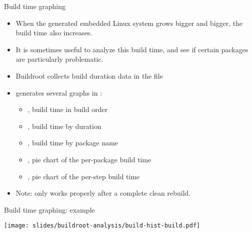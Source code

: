\begin{frame}{Build time graphing}
  \begin{itemize}
  \item When the generated embedded Linux system grows bigger and
    bigger, the build time also increases.
  \item It is sometimes useful to analyze this build time, and see if
    certain packages are particularly problematic.
  \item Buildroot collects build duration data in the file
  \item {} generates several graphs in
    :
    \begin{itemize}
    \item {}, build time in build order
    \item {}, build time by duration
    \item {}, build time by package name
    \item {}, pie chart of the per-package
      build time
    \item {}, pie chart of the per-step build
      time
    \end{itemize}
  \item Note: only works properly after a complete clean rebuild.
  \end{itemize}
\end{frame}

\begin{frame}{Build time graphing: example}
  \begin{center}
    \texttt{[image: slides/buildroot-analysis/build-hist-build.pdf]}
  \end{center}
\end{frame}

